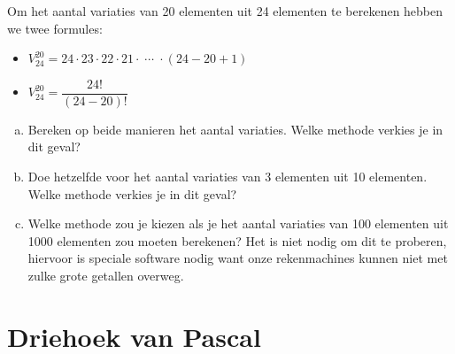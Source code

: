 \documentclass[12pt,twoside]{article}
\begin{document}
\begin{oefening}
Om het aantal variaties van 20 elementen uit 24 elementen te berekenen hebben we twee formules:\\
\begin{itemize}
  \itemsep1em
  \item $\displaystyle V^{20}_{24}=24\cdot23\cdot22\cdot21\cdot\;\cdots\;\cdot(24-20+1)$
  \item $\displaystyle V^{20}_{24}=\dfrac{24!}{(24-20)!}$
\end{itemize}
\begin{enumerate}[(a)]
  \item Bereken op beide manieren het aantal variaties. Welke methode verkies je in dit geval?
  \item Doe hetzelfde voor het aantal variaties van 3 elementen uit 10 elementen. Welke methode verkies je in dit geval?
  \item Welke methode zou je kiezen als je het aantal variaties van 100 elementen uit 1000 elementen zou moeten berekenen? Het is niet nodig om dit te proberen, hiervoor is speciale software nodig want onze rekenmachines kunnen niet met zulke grote getallen overweg.
\end{enumerate}
\end{oefening}

\pagebreak
\section{Driehoek van Pascal}
\end{document}
